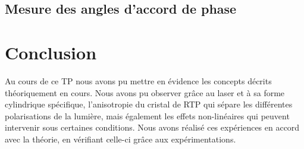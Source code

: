 \documentclass[a4paper,11pt]{report}
\begin{document}
\section{Mesure des angles d'accord de phase}

\chapter*{Conclusion} 
Au cours de ce TP nous avons pu mettre en évidence les concepts décrits théoriquement en cours. Nous avons pu observer grâce au laser et à sa forme cylindrique spécifique, l'anisotropie du cristal de RTP qui sépare les différentes polarisations de la lumière, mais également les effets non-linéaires qui peuvent intervenir sous certaines conditions. Nous avons réalisé ces expériences en accord avec la théorie, en vérifiant celle-ci grâce aux expérimentations.
\end{document}
